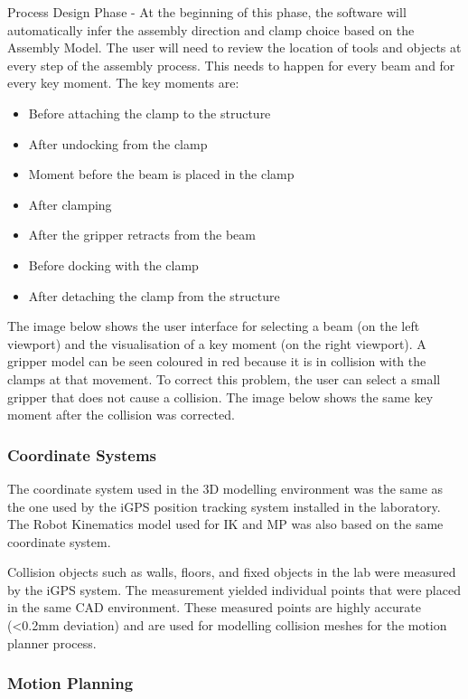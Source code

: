 Process Design Phase - At the beginning of this phase, the software will automatically infer the assembly direction and clamp choice based on the Assembly Model. 
The user will need to review the location of tools and objects at every step of the assembly process. This needs to happen for every beam and for every key moment. The key moments are:
\begin{itemize}
    \item Before attaching the clamp to the structure
    \item After undocking from the clamp
    \item Moment before the beam is placed in the clamp
    \item After clamping
    \item After the gripper retracts from the beam
    \item Before docking with the clamp
    \item After detaching the clamp from the structure
\end{itemize}

The image below shows the user interface for selecting a beam (on the left viewport) and the visualisation of a key moment (on the right viewport). A gripper model can be seen coloured in red because it is in collision with the clamps at that movement. 
To correct this problem, the user can select a small gripper that does not cause a collision. The image below shows the same key moment after the collision was corrected.

\subsubsection{Coordinate Systems}
\label{subsubsection:exploration-2-coordinate-systems}

The coordinate system used in the 3D modelling environment was the same as the one used by the iGPS position tracking system \parencite{stadelmannEndEffectorPoseCorrection2019} installed in the laboratory. The Robot Kinematics model used for IK and MP was also based on the same coordinate system. 

Collision objects such as walls, floors, and fixed objects in the lab were measured by the iGPS system. The measurement yielded individual points that were placed in the same CAD environment. These measured points are highly accurate (<0.2mm deviation) and are used for modelling collision meshes for the motion planner process.

\subsubsection{Motion Planning}
\label{subsubsection:exploration-2-motion-planning}

